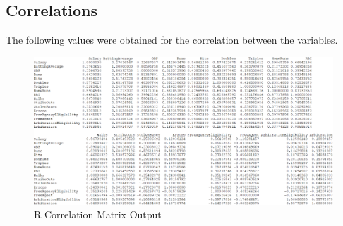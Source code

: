 \documentclass[a4paper, 11pt]{article}
\begin{document}
\subsection*{Correlations}
The following values were obtained for the correlation between the variables.
\vspace{-1em}
\begin{figure}[H]
	\centering
	\caption{R Correlation Matrix Output}
	\centerline{\includegraphics[width=7in]{correlation.png}}
\end{figure}
\end{document}
